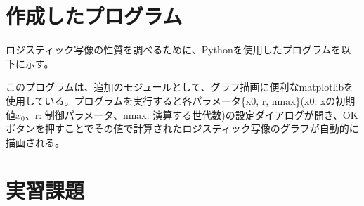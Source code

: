 \documentclass{jsarticle}
\begin{document}
\section{作成したプログラム}
ロジスティック写像の性質を調べるために、Pythonを使用したプログラムを以下に示す。


このプログラムは、追加のモジュールとして、グラフ描画に便利なmatplotlibを使用している。プログラムを実行すると各パラメータ\{x0, r, nmax\}(x0: xの初期値$x_{0}$、r: 制御パラメータ、nmax: 演算する世代数)の設定ダイアログが開き、OKボタンを押すことでその値で計算されたロジスティック写像のグラフが自動的に描画される。

\section{実習課題}
\end{document}

